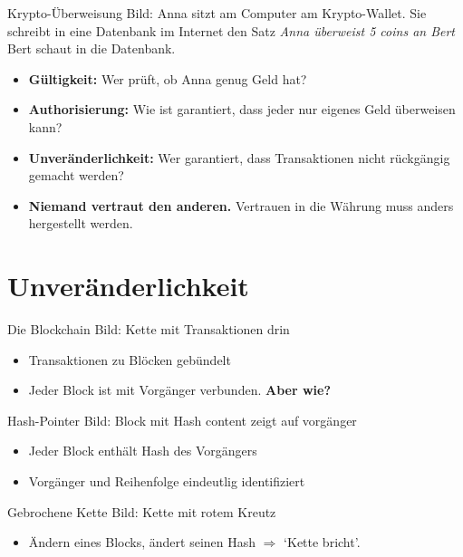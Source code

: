 \documentclass[aspectratio=169]{beamer}
\begin{document}
\begin{frame}{Krypto-Überweisung}
    Bild: Anna sitzt am Computer am Krypto-Wallet. Sie schreibt in eine Datenbank im Internet den Satz \emph{Anna überweist 5 coins an Bert} Bert schaut in die Datenbank.

    \pause
    \begin{itemize}
        \item \textbf{Gültigkeit:} Wer prüft, ob Anna genug Geld hat?
        \item \textbf{Authorisierung:} Wie ist garantiert, dass jeder nur eigenes Geld überweisen kann?
        \item \textbf{Unveränderlichkeit:} Wer garantiert, dass Transaktionen nicht rückgängig gemacht werden?
    \end{itemize}

    \vfill
    \begin{itemize}
        \item \textbf{Niemand vertraut den anderen.} Vertrauen in die Währung muss anders hergestellt werden.
    \end{itemize}
\end{frame}


\section{Unveränderlichkeit}

\begin{frame}{Die Blockchain}
    Bild: Kette mit Transaktionen drin
    \begin{itemize}
        \item Transaktionen zu Blöcken gebündelt
        \item Jeder Block ist mit Vorgänger verbunden.
        \pause
        \textbf{Aber wie?}
    \end{itemize}
\end{frame}


\begin{frame}{Hash-Pointer}
    Bild: Block mit Hash content zeigt auf vorgänger
    \begin{itemize}
        \item Jeder Block enthält Hash des Vorgängers
        \item Vorgänger und Reihenfolge eindeutlig identifiziert
    \end{itemize}
\end{frame}


\begin{frame}{Gebrochene Kette}
    Bild: Kette mit rotem Kreutz
    \begin{itemize}
        \item Ändern eines Blocks, ändert seinen Hash $\Rightarrow$ `Kette bricht'.
    \end{itemize}
\end{frame}
\end{document}
